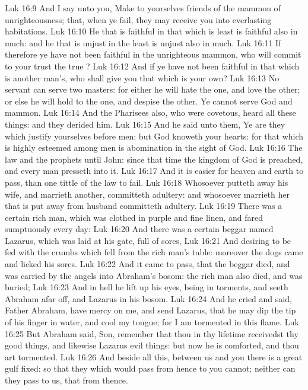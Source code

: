 \vs Luk 16:9 And I say unto you, Make to yourselves friends of the mammon of unrighteousness; that, when ye fail, they may receive you into everlasting habitations.
\vs Luk 16:10 He that is faithful in that which is least is faithful also in much: and he that is unjust in the least is unjust also in much.
\vs Luk 16:11 If therefore ye have not been faithful in the unrighteous mammon, who will commit to your trust the true ?
\vs Luk 16:12 And if ye have not been faithful in that which is another man's, who shall give you that which is your own?
\vs Luk 16:13 No servant can serve two masters: for either he will hate the one, and love the other; or else he will hold to the one, and despise the other. Ye cannot serve God and mammon.
\vs Luk 16:14 And the Pharisees also, who were covetous, heard all these things: and they derided him.
\vs Luk 16:15 And he said unto them, Ye are they which justify yourselves before men; but God knoweth your hearts: for that which is highly esteemed among men is abomination in the sight of God.
\vs Luk 16:16 The law and the prophets  until John: since that time the kingdom of God is preached, and every man presseth into it.
\vs Luk 16:17 And it is easier for heaven and earth to pass, than one tittle of the law to fail.
\vs Luk 16:18 Whosoever putteth away his wife, and marrieth another, committeth adultery: and whosoever marrieth her that is put away from  husband committeth adultery.
\vs Luk 16:19 There was a certain rich man, which was clothed in purple and fine linen, and fared sumptuously every day:
\vs Luk 16:20 And there was a certain beggar named Lazarus, which was laid at his gate, full of sores,
\vs Luk 16:21 And desiring to be fed with the crumbs which fell from the rich man's table: moreover the dogs came and licked his sores.
\vs Luk 16:22 And it came to pass, that the beggar died, and was carried by the angels into Abraham's bosom: the rich man also died, and was buried;
\vs Luk 16:23 And in hell he lift up his eyes, being in torments, and seeth Abraham afar off, and Lazarus in his bosom.
\vs Luk 16:24 And he cried and said, Father Abraham, have mercy on me, and send Lazarus, that he may dip the tip of his finger in water, and cool my tongue; for I am tormented in this flame.
\vs Luk 16:25 But Abraham said, Son, remember that thou in thy lifetime receivedst thy good things, and likewise Lazarus evil things: but now he is comforted, and thou art tormented.
\vs Luk 16:26 And beside all this, between us and you there is a great gulf fixed: so that they which would pass from hence to you cannot; neither can they pass to us, that  from thence.
